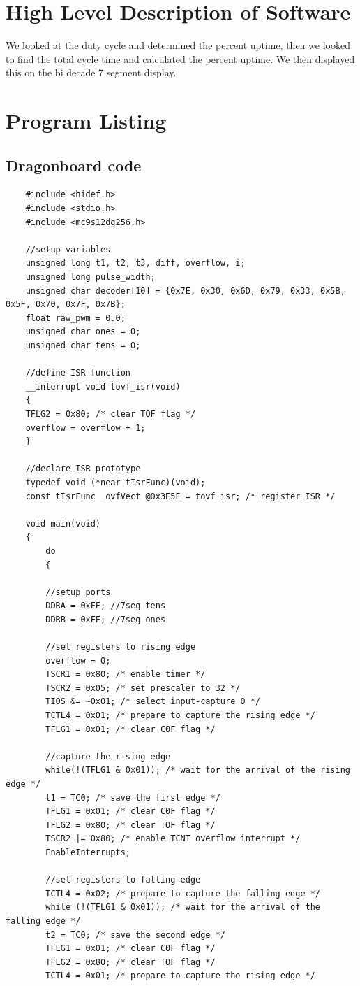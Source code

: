 \documentclass{article}
\begin{document}
	\section*{High Level Description of Software}
	We looked at the duty cycle and determined the percent uptime, then we looked to find the total cycle time and calculated the percent uptime. We then displayed this on the bi decade 7 segment display. 
	\section*{Program Listing}
	\subsection*{Dragonboard code}
	\begin{lstlisting}
	#include <hidef.h>
	#include <stdio.h>
	#include <mc9s12dg256.h>
	
	//setup variables
	unsigned long t1, t2, t3, diff, overflow, i;
	unsigned long pulse_width;
	unsigned char decoder[10] = {0x7E, 0x30, 0x6D, 0x79, 0x33, 0x5B, 0x5F, 0x70, 0x7F, 0x7B};
	float raw_pwm = 0.0;
	unsigned char ones = 0;
	unsigned char tens = 0;
	
	//define ISR function
	__interrupt void tovf_isr(void)
	{
	TFLG2 = 0x80; /* clear TOF flag */
	overflow = overflow + 1;
	}
	
	//declare ISR prototype
	typedef void (*near tIsrFunc)(void);
	const tIsrFunc _ovfVect @0x3E5E = tovf_isr; /* register ISR */
	
	void main(void)
	{
		do
		{  
		
		//setup ports
		DDRA = 0xFF; //7seg tens
		DDRB = 0xFF; //7seg ones
		
		//set registers to rising edge
		overflow = 0;
		TSCR1 = 0x80; /* enable timer */
		TSCR2 = 0x05; /* set prescaler to 32 */
		TIOS &= ~0x01; /* select input-capture 0 */
		TCTL4 = 0x01; /* prepare to capture the rising edge */
		TFLG1 = 0x01; /* clear C0F flag */
		
		//capture the rising edge
		while(!(TFLG1 & 0x01)); /* wait for the arrival of the rising edge */
		t1 = TC0; /* save the first edge */
		TFLG1 = 0x01; /* clear C0F flag */
		TFLG2 = 0x80; /* clear TOF flag */
		TSCR2 |= 0x80; /* enable TCNT overflow interrupt */
		EnableInterrupts;
		
		//set registers to falling edge
		TCTL4 = 0x02; /* prepare to capture the falling edge */
		while (!(TFLG1 & 0x01)); /* wait for the arrival of the falling edge */
		t2 = TC0; /* save the second edge */
		TFLG1 = 0x01; /* clear C0F flag */
		TFLG2 = 0x80; /* clear TOF flag */
		TCTL4 = 0x01; /* prepare to capture the rising edge */
		

\end{lstlisting}
\end{document}
